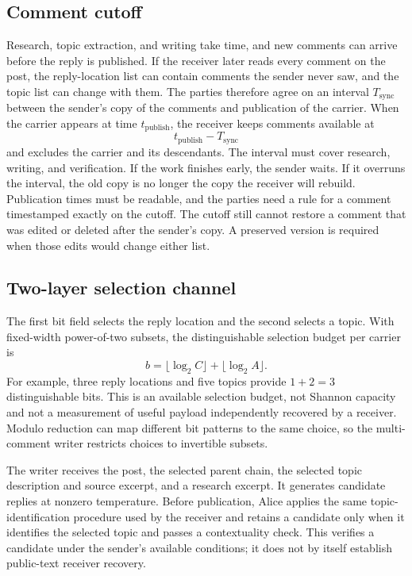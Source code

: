 \documentclass[3p,times,procedia]{elsarticle}
\begin{document}
\subsection{Comment cutoff}

Research, topic extraction, and writing take time, and new comments can arrive before the reply is published. If the receiver later reads every comment on the post, the reply-location list can contain comments the sender never saw, and the topic list can change with them. The parties therefore agree on an interval $T_{\mathrm{sync}}$ between the sender's copy of the comments and publication of the carrier. When the carrier appears at time $t_{\mathrm{publish}}$, the receiver keeps comments available at
\[
t_{\mathrm{publish}}-T_{\mathrm{sync}}
\]
and excludes the carrier and its descendants. The interval must cover research, writing, and verification. If the work finishes early, the sender waits. If it overruns the interval, the old copy is no longer the copy the receiver will rebuild. Publication times must be readable, and the parties need a rule for a comment timestamped exactly on the cutoff. The cutoff still cannot restore a comment that was edited or deleted after the sender's copy. A preserved version is required when those edits would change either list.

\subsection{Two-layer selection channel}

The first bit field selects the reply location and the second selects a topic. With fixed-width power-of-two subsets, the distinguishable selection budget per carrier is
\[
b=\lfloor\log_2 C\rfloor+\lfloor\log_2 A\rfloor.
\]
For example, three reply locations and five topics provide $1+2=3$ distinguishable bits. This is an available selection budget, not Shannon capacity and not a measurement of useful payload independently recovered by a receiver. Modulo reduction can map different bit patterns to the same choice, so the multi-comment writer restricts choices to invertible subsets.

The writer receives the post, the selected parent chain, the selected topic description and source excerpt, and a research excerpt. It generates candidate replies at nonzero temperature. Before publication, Alice applies the same topic-identification procedure used by the receiver and retains a candidate only when it identifies the selected topic and passes a contextuality check. This verifies a candidate under the sender's available conditions; it does not by itself establish public-text receiver recovery.
\end{document}
